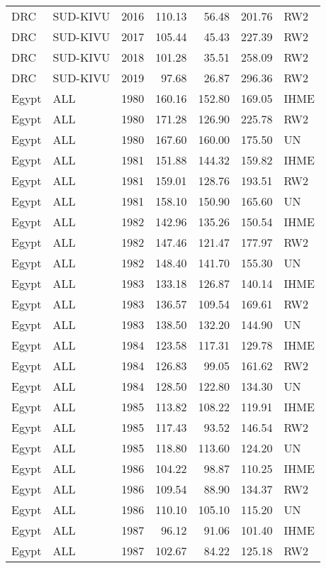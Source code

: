 \begin{longtable}{lllrrrl}
  DRC & SUD-KIVU & 2016 & 110.13 & 56.48 & 201.76 & RW2 \\ 
  DRC & SUD-KIVU & 2017 & 105.44 & 45.43 & 227.39 & RW2 \\ 
  DRC & SUD-KIVU & 2018 & 101.28 & 35.51 & 258.09 & RW2 \\ 
  DRC & SUD-KIVU & 2019 & 97.68 & 26.87 & 296.36 & RW2 \\ 
  Egypt & ALL & 1980 & 160.16 & 152.80 & 169.05 & IHME \\ 
  Egypt & ALL & 1980 & 171.28 & 126.90 & 225.78 & RW2 \\ 
  Egypt & ALL & 1980 & 167.60 & 160.00 & 175.50 & UN \\ 
  Egypt & ALL & 1981 & 151.88 & 144.32 & 159.82 & IHME \\ 
  Egypt & ALL & 1981 & 159.01 & 128.76 & 193.51 & RW2 \\ 
  Egypt & ALL & 1981 & 158.10 & 150.90 & 165.60 & UN \\ 
  Egypt & ALL & 1982 & 142.96 & 135.26 & 150.54 & IHME \\ 
  Egypt & ALL & 1982 & 147.46 & 121.47 & 177.97 & RW2 \\ 
  Egypt & ALL & 1982 & 148.40 & 141.70 & 155.30 & UN \\ 
  Egypt & ALL & 1983 & 133.18 & 126.87 & 140.14 & IHME \\ 
  Egypt & ALL & 1983 & 136.57 & 109.54 & 169.61 & RW2 \\ 
  Egypt & ALL & 1983 & 138.50 & 132.20 & 144.90 & UN \\ 
  Egypt & ALL & 1984 & 123.58 & 117.31 & 129.78 & IHME \\ 
  Egypt & ALL & 1984 & 126.83 & 99.05 & 161.62 & RW2 \\ 
  Egypt & ALL & 1984 & 128.50 & 122.80 & 134.30 & UN \\ 
  Egypt & ALL & 1985 & 113.82 & 108.22 & 119.91 & IHME \\ 
  Egypt & ALL & 1985 & 117.43 & 93.52 & 146.54 & RW2 \\ 
  Egypt & ALL & 1985 & 118.80 & 113.60 & 124.20 & UN \\ 
  Egypt & ALL & 1986 & 104.22 & 98.87 & 110.25 & IHME \\ 
  Egypt & ALL & 1986 & 109.54 & 88.90 & 134.37 & RW2 \\ 
  Egypt & ALL & 1986 & 110.10 & 105.10 & 115.20 & UN \\ 
  Egypt & ALL & 1987 & 96.12 & 91.06 & 101.40 & IHME \\ 
  Egypt & ALL & 1987 & 102.67 & 84.22 & 125.18 & RW2 \\ 

\end{longtable}
